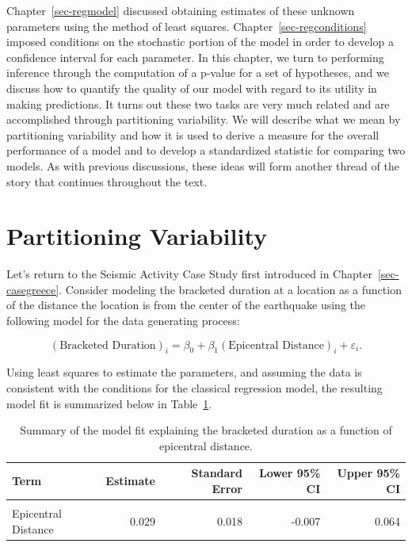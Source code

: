 \documentclass[
  letterpaper,
  DIV=11,
  numbers=noendperiod]{scrreprt}
\theoremstyle{plain}
\theoremstyle{definition}
\theoremstyle{definition}
\theoremstyle{remark}
\begin{document}
Chapter~\ref{sec-regmodel} discussed obtaining estimates of these
unknown parameters using the method of least squares.
Chapter~\ref{sec-regconditions} imposed conditions on the stochastic
portion of the model in order to develop a confidence interval for each
parameter. In this chapter, we turn to performing inference through the
computation of a p-value for a set of hypotheses, and we discuss how to
quantify the quality of our model with regard to its utility in making
predictions. It turns out these two tasks are very much related and are
accomplished through partitioning variability. We will describe what we
mean by partitioning variability and how it is used to derive a measure
for the overall performance of a model and to develop a standardized
statistic for comparing two models. As with previous discussions, these
ideas will form another thread of the story that continues throughout
the text.

\hypertarget{partitioning-variability}{%
\section{Partitioning Variability}\label{partitioning-variability}}

Let's return to the Seismic Activity Case Study first introduced in
Chapter~\ref{sec-casegreece}. Consider modeling the bracketed duration
at a location as a function of the distance the location is from the
center of the earthquake using the following model for the data
generating process:

\[(\text{Bracketed Duration})_i = \beta_0 + \beta_1(\text{Epicentral Distance})_i + \varepsilon_i.\]

Using least squares to estimate the parameters, and assuming the data is
consistent with the conditions for the classical regression model, the
resulting model fit is summarized below in
Table~\ref{tbl-regquality-fit}.

\hypertarget{tbl-regquality-fit}{}
\begin{table}
\caption{\label{tbl-regquality-fit}Summary of the model fit explaining the bracketed duration as a function
of epicentral distance. }\tabularnewline

\centering
\begin{tabular}[t]{lrrrr}
\toprule
Term & Estimate & Standard Error & Lower 95\% CI & Upper 95\% CI\\
\midrule
\cellcolor{gray!6}{(Intercept)} & \cellcolor{gray!6}{4.462} & \cellcolor{gray!6}{0.726} & \cellcolor{gray!6}{3.024} & \cellcolor{gray!6}{5.899}\\
Epicentral Distance & 0.029 & 0.018 & -0.007 & 0.064\\
\bottomrule
\end{tabular}
\end{table}
\end{document}
